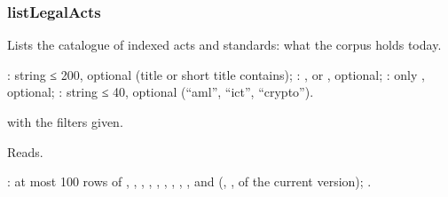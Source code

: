 \subsubsection{listLegalActs}\label{sec:tools:listLegalActs}
\begin{description}[style=multiline, leftmargin=19mm, labelwidth=17mm, labelsep=2mm,
  font=\sffamily\bfseries\footnotesize\color{ink}, itemsep=1pt, topsep=2pt, before=\raggedright]
  \item[Does] Lists the catalogue of indexed acts and standards: what the corpus holds today.
  \item[Input] : string ≤ 200, optional (title or short title contains);
    : ,  or , optional; : only
    , optional; : string ≤ 40, optional (\enquote{aml},
    \enquote{ict}, \enquote{crypto}).
  \item[Calls]  with the filters given.
  \item[Kind] Reads.
  \item[Returns] : at most 100 rows of , , ,
    , , , , ,
    ,  and  (,
    ,  of the current version); .
\end{description}

